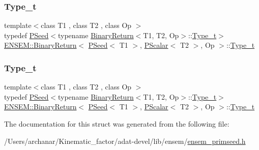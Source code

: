 \subsubsection{\texorpdfstring{Type\_t}{Type\_t}\hspace{0.1cm}{\footnotesize\ttfamily [2/3]}}
{\footnotesize\ttfamily template$<$class T1 , class T2 , class Op $>$ \\
typedef \mbox{\hyperlink{classENSEM_1_1PSeed}{P\+Seed}}$<$typename \mbox{\hyperlink{structENSEM_1_1BinaryReturn}{Binary\+Return}}$<$T1, T2, Op$>$\+::\mbox{\hyperlink{structENSEM_1_1BinaryReturn_3_01PSeed_3_01T1_01_4_00_01PScalar_3_01T2_01_4_00_01Op_01_4_a4130a6d592ca5e069c711c81b422aa54}{Type\+\_\+t}}$>$ \mbox{\hyperlink{structENSEM_1_1BinaryReturn}{E\+N\+S\+E\+M\+::\+Binary\+Return}}$<$ \mbox{\hyperlink{classENSEM_1_1PSeed}{P\+Seed}}$<$ T1 $>$, \mbox{\hyperlink{classENSEM_1_1PScalar}{P\+Scalar}}$<$ T2 $>$, Op $>$\+::\mbox{\hyperlink{structENSEM_1_1BinaryReturn_3_01PSeed_3_01T1_01_4_00_01PScalar_3_01T2_01_4_00_01Op_01_4_a4130a6d592ca5e069c711c81b422aa54}{Type\+\_\+t}}}

\mbox{\label{structENSEM_1_1BinaryReturn_3_01PSeed_3_01T1_01_4_00_01PScalar_3_01T2_01_4_00_01Op_01_4_a4130a6d592ca5e069c711c81b422aa54}} 
\subsubsection{\texorpdfstring{Type\_t}{Type\_t}\hspace{0.1cm}{\footnotesize\ttfamily [3/3]}}
{\footnotesize\ttfamily template$<$class T1 , class T2 , class Op $>$ \\
typedef \mbox{\hyperlink{classENSEM_1_1PSeed}{P\+Seed}}$<$typename \mbox{\hyperlink{structENSEM_1_1BinaryReturn}{Binary\+Return}}$<$T1, T2, Op$>$\+::\mbox{\hyperlink{structENSEM_1_1BinaryReturn_3_01PSeed_3_01T1_01_4_00_01PScalar_3_01T2_01_4_00_01Op_01_4_a4130a6d592ca5e069c711c81b422aa54}{Type\+\_\+t}}$>$ \mbox{\hyperlink{structENSEM_1_1BinaryReturn}{E\+N\+S\+E\+M\+::\+Binary\+Return}}$<$ \mbox{\hyperlink{classENSEM_1_1PSeed}{P\+Seed}}$<$ T1 $>$, \mbox{\hyperlink{classENSEM_1_1PScalar}{P\+Scalar}}$<$ T2 $>$, Op $>$\+::\mbox{\hyperlink{structENSEM_1_1BinaryReturn_3_01PSeed_3_01T1_01_4_00_01PScalar_3_01T2_01_4_00_01Op_01_4_a4130a6d592ca5e069c711c81b422aa54}{Type\+\_\+t}}}



The documentation for this struct was generated from the following file\+:\begin{DoxyCompactItemize}
\item 
/\+Users/archanar/\+Kinematic\+\_\+factor/adat-\/devel/lib/ensem/\mbox{\hyperlink{adat-devel_2lib_2ensem_2ensem__primseed_8h}{ensem\+\_\+primseed.\+h}}\end{DoxyCompactItemize}

